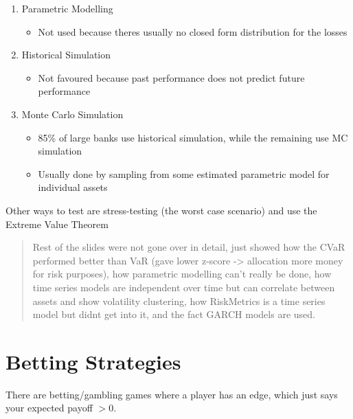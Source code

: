 \documentclass[
  oneside]{book}
\providecommand{\tightlist}{%
  \setlength{\itemsep}{0pt}\setlength{\parskip}{0pt}}
\begin{document}
\begin{enumerate}
\def\labelenumi{\arabic{enumi}.}
\tightlist
\item
  Parametric Modelling

  \begin{itemize}
  \tightlist
  \item
    Not used because theres usually no closed form distribution for the losses
  \end{itemize}
\item
  Historical Simulation

  \begin{itemize}
  \tightlist
  \item
    Not favoured because past performance does not predict future performance
  \end{itemize}
\item
  Monte Carlo Simulation

  \begin{itemize}
  \tightlist
  \item
    85\% of large banks use historical simulation, while the remaining use MC simulation
  \item
    Usually done by sampling from some estimated parametric model for individual assets
  \end{itemize}
\end{enumerate}

Other ways to test are stress-testing (the worst case scenario) and use the Extreme Value Theorem

\begin{quote}
Rest of the slides were not gone over in detail, just showed how the CVaR performed better than VaR (gave lower z-score -\textgreater{} allocation more money for risk purposes), how parametric modelling can't really be done, how time series models are independent over time but can correlate between assets and show volatility clustering, how RiskMetrics is a time series model but didnt get into it, and the fact GARCH models are used.
\end{quote}

\hypertarget{betting-strategies}{%
\chapter{Betting Strategies}\label{betting-strategies}}

There are betting/gambling games where a player has an edge, which just says your expected payoff \(>0\).
\end{document}
